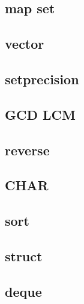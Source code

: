         \subsection{map set}
                
        \subsection{vector}
                
        \subsection{setprecision}
                
        \subsection{GCD LCM}
                
        \subsection{reverse}
                
        \subsection{CHAR}
                
        \subsection{sort}
                
        \subsection{struct}
                
        \subsection{deque}
                